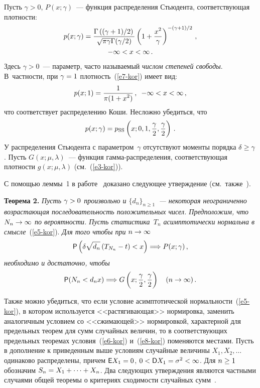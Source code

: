 \begin{multicols}{2}
\smallskip

Пусть $\gamma>0$, $P(x;\gamma)$~--- функция распределения
Стьюдента, соответствующая плот\-ности:
\begin{multline}
p(x;\gamma) =
\displaystyle\frac{\displaystyle \Gamma\left((\gamma+1)/2\right)\mathstrut}{\displaystyle \sqrt{\pi\gamma}\Gamma
(\gamma/2)\mathstrut}\left(1+\displaystyle\frac{\displaystyle x^2\mathstrut}{\displaystyle \gamma\mathstrut}\right)^{-(\gamma+1)/2}\,,\\
 -\infty<x<\infty\,.\label{e7-kor}
\end{multline}
Здесь $\gamma>0$~--- параметр, часто называемый \textit{чис\-лом
степеней свободы}. В~частности, при $\gamma\hm=1$ плот\-ность~(\ref{e7-kor}) имеет
вид:
$$
p(x;1)=\displaystyle\frac{\displaystyle 1\mathstrut}{\displaystyle \pi(1+x^2)\mathstrut}\,,\enskip  -\infty<x<\infty\,,
$$
что соответствует распределению Коши. Несложно убедиться, что
$$
p(x;\gamma)=p_{\mathrm{SS}}\left(x;0,1,\displaystyle\frac{\displaystyle \gamma\mathstrut}{\displaystyle 2\mathstrut},\displaystyle\frac{\displaystyle \gamma\mathstrut}{\displaystyle 2\mathstrut}\right)\,.
$$
У распределения Стьюдента с параметром~$\gamma$ отсутствуют
моменты порядка $\delta\hm\ge\gamma$. Пусть $G(x;\mu,\lambda)$~---
функция гам\-ма-рас\-пре\-де\-ле\-ния, соответствующая плот\-ности
$g(x;\mu,\lambda)$ (см.~(\ref{e3-kor})).

С помощью леммы~1 в работе~\cite{BeningKorolev2004} доказано
следующее утверждение (см.\ так\-же~\cite{Korolev2011, KorolevBeningShorgin2011}).

\smallskip

\noindent
\textbf{Теорема 2.} \textit{Пусть $\gamma\hm>0$ произвольно и
$\{d_n\}_{n\ge1}$~--- некоторая неограниченно возрастающая
последовательность положительных чисел. Предположим, что
$N_n\hm\to\infty$ по вероятности. Пусть статистика~$T_n$
асимптотически нормальна в смысле}~(\ref{e5-kor}). \textit{Для того чтобы при}
$n\hm\to\infty$
$$
{\sf P}\left(\delta\sqrt{d_n}\left(T_{N_n}-t\right)<x\right) 
\Longrightarrow  P(x;\gamma)\,,
$$
\textit{необходимо и достаточно, чтобы}
\begin{equation}
{\sf P}(N_n<d_nx)\Longrightarrow G\left(x;\displaystyle\frac{\displaystyle \gamma\mathstrut}{\displaystyle 2\mathstrut},\displaystyle\frac{\displaystyle \gamma\mathstrut}{\displaystyle 2\mathstrut}\right)\quad
(n\to\infty)\,.\label{e8-kor}
\end{equation}

\smallskip

Также можно убедиться, что если условие асимптотической
нормальности~(\ref{e5-kor}), в котором используется <<растягивающая>>
нормировка, заменить аналогич\-ным условием со <<сжимающей>>
нормировкой, характерной для предельных теорем для сумм случайных
величин, то в соответствующих предельных теоремах условия~(\ref{e6-kor}) и~(\ref{e8-kor}) 
поменяются местами. Пусть в дополнение к приведенным выше
условиям случайные величины $X_1,X_2,\ldots$ одинаково
распределены, причем ${\sf E}X_1\hm=0$, $0\hm<{\sf
D}X_1\hm=\sigma^2<\infty$. Для $n\hm\ge1$ обозначим
$S_n\hm=X_1\hm+\cdots+X_n$. Два следующих утверждения являются частными
случаями общей теоремы о критериях сходимости случайных сумм~\cite{Korolev1994}.


\end{multicols}
